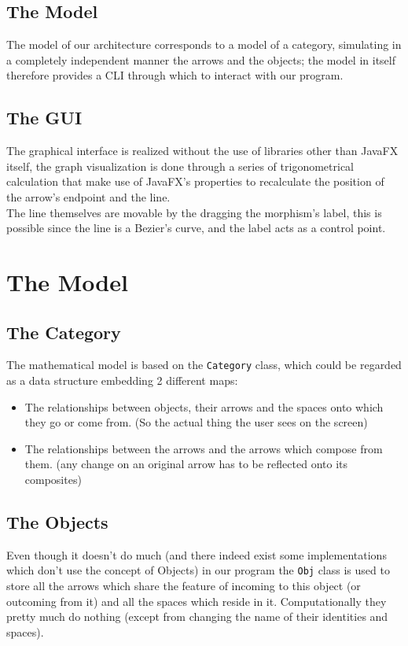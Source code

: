 \documentclass{article}
\begin{document}
    \subsection{The Model}
        The model of our architecture corresponds to a model of a category, simulating in a completely independent manner the arrows and the objects; the model in itself therefore provides a CLI through which to interact with our program.
        
    \subsection{The GUI}
        The graphical interface is realized without the use of libraries other than JavaFX itself, the graph visualization is done through a series of trigonometrical calculation that make use of JavaFX's properties to recalculate the position of the arrow's endpoint and the line. \\
        The line themselves are movable by the dragging the morphism's label, this is possible since the line is a Bezier's curve, and the label acts as a control point.

\section{The Model}
    \subsection{The Category}
        The mathematical model is based on the \texttt{Category} class, which could be regarded as a data structure embedding 2 different maps:
        \begin{itemize}
            \item The relationships between objects, their arrows and the spaces onto which they go or come from. (So the actual thing the user sees on the screen)
            \item The relationships between the arrows and the arrows which compose from them. (any change on an original arrow has to be reflected onto its composites)
        \end{itemize}
    \subsection{The Objects}
        Even though it doesn't do much (and there indeed exist some implementations which don't use the concept of Objects) in our program the \texttt{Obj} class is used to store all the arrows which share the feature of incoming to this object (or outcoming from it) and all the spaces which reside in it. Computationally they pretty much do nothing (except from changing the name of their identities and spaces).
\end{document}
